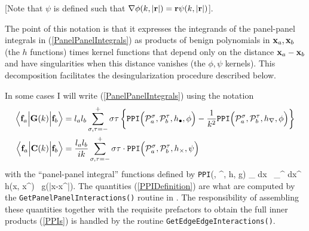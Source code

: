 \documentclass[letterpaper]{article}
\begin{document}
[Note that $\psi$ is defined such that 
$\nabla \phi(k, |\mathbf{r}|) = \mathbf{r} \psi(k, |\mathbf{r}|)$].

The point of this notation is that it expresses the 
integrands of the panel-panel integrals in (\ref{PanelPanelIntegrals}) 
as products of benign polynomials in $\mathbf{x}_a, \mathbf{x}_b$
(the $h$ functions) times kernel functions that depend only 
on the distance $\mathbf{x}_a-\mathbf{x}_b$ and have singularities 
when this distance vanishes (the $\phi, \psi$ kernels).
This decomposition facilitates the desingularization procedure
described below.

In some cases I will write (\ref{PanelPanelIntegrals}) 
using the notation
\begin{subequations}
\begin{align}
 \Big\langle \mathbf{f}_a \Big| \mathbf{G}(k) \Big | \mathbf{f}_b \Big \rangle
&=
  l_a l_b 
  \sum_{\sigma, \tau=-}^+ 
  \sigma\tau
  \left\{               \texttt{PPI}\Big(\mathcal{P}_a^\sigma, \mathcal{P}_b^\tau, h_\bullet, \phi\Big) 
         -\frac{1}{k^2} \texttt{PPI}\Big(\mathcal{P}_a^\sigma, \mathcal{P}_b^\tau, h_\nabla,  \phi\Big) 
  \right\}
\\
 \Big\langle \mathbf{f}_a \Big| \mathbf{C}(k) \Big | \mathbf{f}_b \Big \rangle
&=
  \frac{l_a l_b }{ik}
  \sum_{\sigma, \tau=-}^+ \sigma \tau \cdot 
   \texttt{PPI}\Big(\mathcal{P}_a^\sigma, \mathcal{P}_b^\tau, h_\times, \psi\Big) 
\end{align}
\label{PPIs}
\end{subequations}
with the ``panel-panel integral'' functions defined by 
{
   \texttt{PPI}\Big(\pan, \pan^\prime, h, g\Big)
   \equiv 
   \int_{\pan} d\vb x \, 
   \int_{\pan^\prime} d\vb x^\prime \, 
   h(\vb x, \vb x^\prime) \, g(|\vb x-\vb x^\prime|).
}
The quantities (\ref{PPIDefinition}) are what are computed 
by the \texttt{GetPanelPanelInteractions()} routine in \ls. 
The responsibility of assembling these quantities together with
the requisite prefactors to obtain the full inner products
(\ref{PPIs}) is handled by the routine 
\texttt{GetEdgeEdgeInteractions()}.
\end{document}
